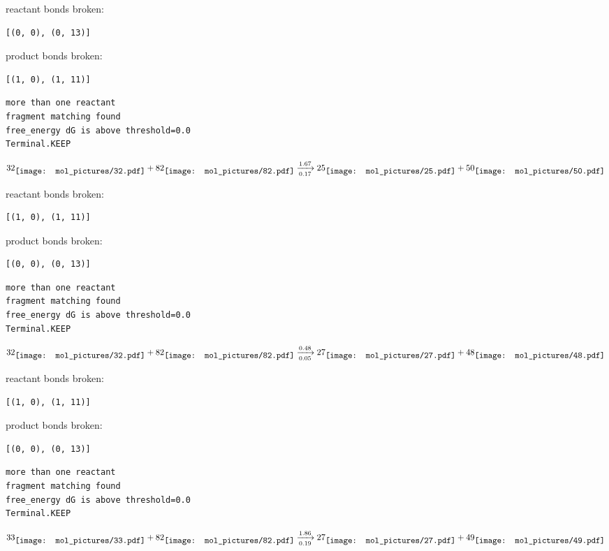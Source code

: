 \documentclass{article}
\begin{document}
reactant bonds broken:\begin{verbatim}
[(0, 0), (0, 13)]
\end{verbatim}
product bonds broken:\begin{verbatim}
[(1, 0), (1, 11)]
\end{verbatim}




\vspace{1cm}
\begin{verbatim}
more than one reactant
fragment matching found
free_energy dG is above threshold=0.0
Terminal.KEEP
\end{verbatim}
$$
32
\raisebox{-.5\height}{\texttt{[image: mol\_pictures/32.pdf]}}
+
82
\raisebox{-.5\height}{\texttt{[image: mol\_pictures/82.pdf]}}
\xrightarrow[0.17]{1.67}
25
\raisebox{-.5\height}{\texttt{[image: mol\_pictures/25.pdf]}}
+
50
\raisebox{-.5\height}{\texttt{[image: mol\_pictures/50.pdf]}}
$$


reactant bonds broken:\begin{verbatim}
[(1, 0), (1, 11)]
\end{verbatim}
product bonds broken:\begin{verbatim}
[(0, 0), (0, 13)]
\end{verbatim}




\vspace{1cm}
\begin{verbatim}
more than one reactant
fragment matching found
free_energy dG is above threshold=0.0
Terminal.KEEP
\end{verbatim}
$$
32
\raisebox{-.5\height}{\texttt{[image: mol\_pictures/32.pdf]}}
+
82
\raisebox{-.5\height}{\texttt{[image: mol\_pictures/82.pdf]}}
\xrightarrow[0.05]{0.48}
27
\raisebox{-.5\height}{\texttt{[image: mol\_pictures/27.pdf]}}
+
48
\raisebox{-.5\height}{\texttt{[image: mol\_pictures/48.pdf]}}
$$


reactant bonds broken:\begin{verbatim}
[(1, 0), (1, 11)]
\end{verbatim}
product bonds broken:\begin{verbatim}
[(0, 0), (0, 13)]
\end{verbatim}




\vspace{1cm}
\begin{verbatim}
more than one reactant
fragment matching found
free_energy dG is above threshold=0.0
Terminal.KEEP
\end{verbatim}
$$
33
\raisebox{-.5\height}{\texttt{[image: mol\_pictures/33.pdf]}}
+
82
\raisebox{-.5\height}{\texttt{[image: mol\_pictures/82.pdf]}}
\xrightarrow[0.19]{1.86}
27
\raisebox{-.5\height}{\texttt{[image: mol\_pictures/27.pdf]}}
+
49
\raisebox{-.5\height}{\texttt{[image: mol\_pictures/49.pdf]}}
$$
\end{document}
